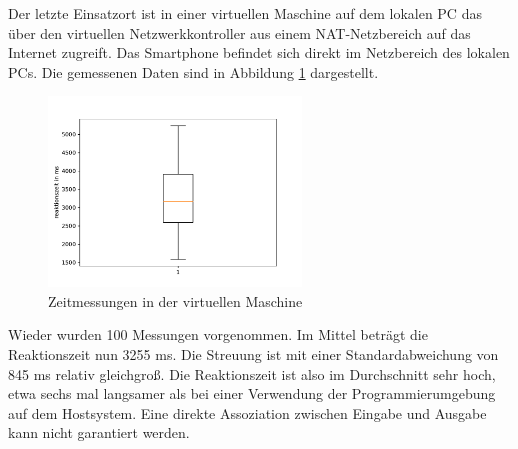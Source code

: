 \documentclass[11pt,a4paper]{report}
\begin{document}
Der letzte Einsatzort ist in einer virtuellen Maschine auf dem lokalen PC das über den virtuellen Netzwerkkontroller aus einem NAT-Netzbereich auf das Internet zugreift.
Das Smartphone befindet sich direkt im Netzbereich des lokalen PCs.
Die gemessenen Daten sind in Abbildung \ref{fig:measure_vm} dargestellt.
\begin{figure}[htbp]
  \centering
  \includegraphics[width=0.6\textwidth]{images/timing_vm}
  \caption{Zeitmessungen in der virtuellen Maschine}
  \label{fig:measure_vm}
\end{figure}
Wieder wurden 100 Messungen vorgenommen.
Im Mittel beträgt die Reaktionszeit nun 3255 ms.
Die Streuung ist mit einer Standardabweichung von 845 ms relativ gleichgroß.
Die Reaktionszeit ist also im Durchschnitt sehr hoch, etwa sechs mal langsamer als bei einer Verwendung der Programmierumgebung auf dem Hostsystem.
Eine direkte Assoziation zwischen Eingabe und Ausgabe kann nicht garantiert werden.
\end{document}
